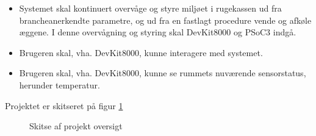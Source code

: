 \begin{itemize}
\item Systemet skal kontinuert overvåge og styre miljøet i rugekassen ud fra brancheanerkendte parametre, og ud fra en fastlagt procedure vende og afkøle æggene. I denne overvågning og styring skal DevKit8000 og PSoC3 indgå.
\item Brugeren skal, vha. DevKit8000, kunne interagere med systemet. 
\item Brugeren skal, vha. DevKit8000, kunne se rummets nuværende sensorstatus, herunder temperatur.
\end{itemize}
\newpage
Projektet er skitseret på figur \ref{fig:projektoversigt} 
\begin{figure}[H]
\centering
{}
\caption{Skitse af projekt oversigt}
\label{fig:projektoversigt}
\end{figure}
